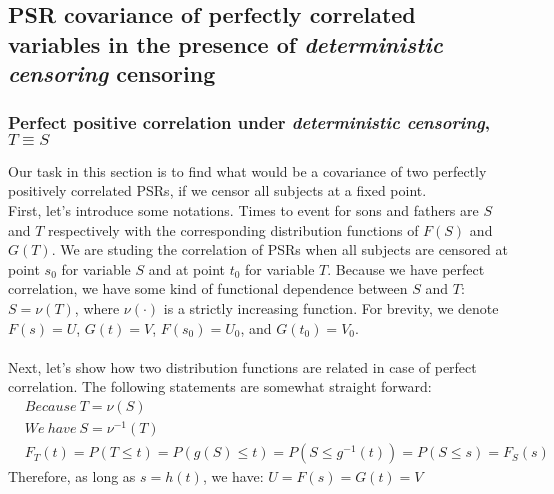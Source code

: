 \documentclass[]{article}
\begin{document}
\subsection{PSR covariance of perfectly correlated variables in the presence of \emph{deterministic censoring} censoring}

\subsubsection{Perfect positive correlation under \emph{deterministic censoring}, $T\equiv S$}
\label{perfPosCorDeterm}
Our task in this section is to find what would be a covariance of two perfectly positively correlated PSRs, if we censor all subjects at a fixed point.\\

First, let's introduce some notations. Times to event for sons and fathers are $S$ and $T$ respectively with the corresponding distribution functions of $F(S)$ and $G(T)$. We are studing the correlation of PSRs when all subjects are censored at point $s_0$ for variable $S$ and at point $t_0$ for variable $T$. Because we have perfect correlation, we have some kind of functional dependence between $S$ and $T$: $S =\nu( T)$, where $\nu(\cdot)$ is a strictly increasing function. For brevity, we denote $F(s)=U$, $G(t)=V$, $F(s_0)=U_0$, and $G(t_0)=V_0$.\\
~\\

Next, let's show how two distribution functions are related in case of perfect correlation. The following statements are somewhat straight forward:
	$$
	\begin{aligned}
    &Because~T = \nu(S)\\
    &We~have~S = \nu^{-1}(T)\\
    &F_T(t) = P(T \leq t) = P\left(g(S) \leq t\right) = P(S\leq g^{-1}(t)) = P(S\leq s) = F_S(s) 
	\end{aligned}
	$$
Therefore, as long as $s=h(t)$, we have: $U=F(s) = G(t) = V$
\end{document}
